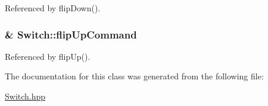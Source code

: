 Referenced by flip\-Down().

\hypertarget{classSwitch_aa6e2a2d4568aa542ab2e28e5a4da1d3c}{
\subsubsection[{flip\-Up\-Command}]{\& Switch\-::flip\-Up\-Command\hspace{0.3cm}{\ttfamily [private]}}}\label{classSwitch_aa6e2a2d4568aa542ab2e28e5a4da1d3c}


Referenced by flip\-Up().



The documentation for this class was generated from the following file\-:\begin{DoxyCompactItemize}
\item 
\hyperlink{Switch_8hpp}{Switch.\-hpp}\end{DoxyCompactItemize}
